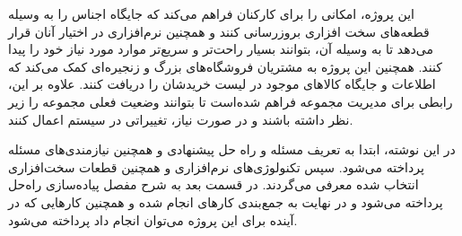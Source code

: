 این پروژه، امکانی را برای کارکنان فراهم می‌کند که جایگاه اجناس را به وسیله قطعه‌های سخت افزاری بروزرسانی کنند و همچنین نرم‌افزاری در اختیار آنان قرار می‌دهد تا به وسیله آن، بتوانند بسیار راحت‌تر و سریع‌تر موارد مورد نیاز خود را پیدا کنند. همچنین این پروژه به مشتریان فروشگاه‌های بزرگ و زنجیره‌ای کمک می‌کند که اطلاعات و جایگاه کالاهای موجود در لیست خریدشان را دریافت کنند. علاوه بر این، رابطی برای مدیریت مجموعه فراهم شده‌است تا بتوانند وضعیت فعلی مجموعه را زیر نظر داشته باشند و در صورت نیاز، تغییراتی در سیستم اعمال کنند.
 
در این نوشته، ابتدا به تعریف مسئله و راه حل پیشنهادی و همچنین نیازمندی‌های مسئله پرداخته می‌شود. سپس تکنولوژی‌های نرم‌افزاری و همچنین قطعات سخت‌افزاری انتخاب شده معرفی می‌گردند. در قسمت بعد به شرح مفصل پیاده‌سازی راه‌حل پرداخته می‌شود و در نهایت به جمع‌بندی کارهای انجام شده و همچنین کارهایی که در آینده برای این پروژه می‌توان انجام داد پرداخته می‌شود.